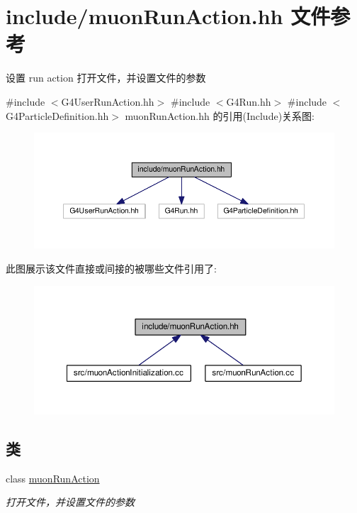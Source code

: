 \hypertarget{muonRunAction_8hh}{}\section{include/muon\+Run\+Action.hh 文件参考}
\label{muonRunAction_8hh}


设置 run action 打开文件，并设置文件的参数  


{\ttfamily \#include $<$G4\+User\+Run\+Action.\+hh$>$}\newline
{\ttfamily \#include $<$G4\+Run.\+hh$>$}\newline
{\ttfamily \#include $<$G4\+Particle\+Definition.\+hh$>$}\newline
muon\+Run\+Action.\+hh 的引用(Include)关系图\+:\nopagebreak
\begin{figure}[H]
\begin{center}
\leavevmode
\includegraphics[width=350pt]{muonRunAction_8hh__incl}
\end{center}
\end{figure}
此图展示该文件直接或间接的被哪些文件引用了\+:\nopagebreak
\begin{figure}[H]
\begin{center}
\leavevmode
\includegraphics[width=350pt]{muonRunAction_8hh__dep__incl}
\end{center}
\end{figure}
\subsection*{类}
\begin{DoxyCompactItemize}
\item 
class \hyperlink{classmuonRunAction}{muon\+Run\+Action}
\begin{DoxyCompactList}\small\item\em 打开文件，并设置文件的参数 \end{DoxyCompactList}\end{DoxyCompactItemize}


